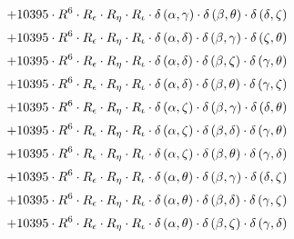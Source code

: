 \begin{subequations}
\begin{gather}
 \\[0.2em] \notag 		 + 10395 \cdot R^{6} \cdot R_{\epsilon{}} \cdot R_{\eta{}} \cdot R_{\iota{}} \cdot \delta{}\left(\alpha{}, \gamma{}\right) \cdot \delta{}\left(\beta{}, \theta{}\right) \cdot \delta{}\left(\delta{}, \zeta{}\right) 
 \\[0.2em] \notag 		 + 10395 \cdot R^{6} \cdot R_{\epsilon{}} \cdot R_{\eta{}} \cdot R_{\iota{}} \cdot \delta{}\left(\alpha{}, \delta{}\right) \cdot \delta{}\left(\beta{}, \gamma{}\right) \cdot \delta{}\left(\zeta{}, \theta{}\right) 
 \\[0.2em] \notag 		 + 10395 \cdot R^{6} \cdot R_{\epsilon{}} \cdot R_{\eta{}} \cdot R_{\iota{}} \cdot \delta{}\left(\alpha{}, \delta{}\right) \cdot \delta{}\left(\beta{}, \zeta{}\right) \cdot \delta{}\left(\gamma{}, \theta{}\right) 
 \\[0.2em] \notag 		 + 10395 \cdot R^{6} \cdot R_{\epsilon{}} \cdot R_{\eta{}} \cdot R_{\iota{}} \cdot \delta{}\left(\alpha{}, \delta{}\right) \cdot \delta{}\left(\beta{}, \theta{}\right) \cdot \delta{}\left(\gamma{}, \zeta{}\right) 
 \\[0.2em] \notag 		 + 10395 \cdot R^{6} \cdot R_{\epsilon{}} \cdot R_{\eta{}} \cdot R_{\iota{}} \cdot \delta{}\left(\alpha{}, \zeta{}\right) \cdot \delta{}\left(\beta{}, \gamma{}\right) \cdot \delta{}\left(\delta{}, \theta{}\right) 
 \\[0.2em] \notag 		 + 10395 \cdot R^{6} \cdot R_{\epsilon{}} \cdot R_{\eta{}} \cdot R_{\iota{}} \cdot \delta{}\left(\alpha{}, \zeta{}\right) \cdot \delta{}\left(\beta{}, \delta{}\right) \cdot \delta{}\left(\gamma{}, \theta{}\right) 
 \\[0.2em] \notag 		 + 10395 \cdot R^{6} \cdot R_{\epsilon{}} \cdot R_{\eta{}} \cdot R_{\iota{}} \cdot \delta{}\left(\alpha{}, \zeta{}\right) \cdot \delta{}\left(\beta{}, \theta{}\right) \cdot \delta{}\left(\gamma{}, \delta{}\right) 
 \\[0.2em] \notag 		 + 10395 \cdot R^{6} \cdot R_{\epsilon{}} \cdot R_{\eta{}} \cdot R_{\iota{}} \cdot \delta{}\left(\alpha{}, \theta{}\right) \cdot \delta{}\left(\beta{}, \gamma{}\right) \cdot \delta{}\left(\delta{}, \zeta{}\right) 
 \\[0.2em] \notag 		 + 10395 \cdot R^{6} \cdot R_{\epsilon{}} \cdot R_{\eta{}} \cdot R_{\iota{}} \cdot \delta{}\left(\alpha{}, \theta{}\right) \cdot \delta{}\left(\beta{}, \delta{}\right) \cdot \delta{}\left(\gamma{}, \zeta{}\right) 
 \\[0.2em] \notag 		 + 10395 \cdot R^{6} \cdot R_{\epsilon{}} \cdot R_{\eta{}} \cdot R_{\iota{}} \cdot \delta{}\left(\alpha{}, \theta{}\right) \cdot \delta{}\left(\beta{}, \zeta{}\right) \cdot \delta{}\left(\gamma{}, \delta{}\right) 

\end{gather}
\end{subequations}

